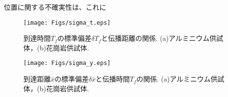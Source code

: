位置に関する不確実性は、これに
\begin{figure}
\begin{center}
	\texttt{[image: Figs/sigma\_t.eps]}
	\caption{到達時間$T_f$の標準偏差$\delta T_f$と伝播距離の関係. (a)アルミニウム供試体，(b)花崗岩供試体.}
	\label{fig:fig13}
\end{center}
\end{figure}
\begin{figure}
\begin{center}
	\texttt{[image: Figs/sigma\_y.eps]}
	\caption{到達距離$\bar{x}$の標準偏差$\delta \bar{x}$と伝播時間$T_f$の関係. (a)アルミニウム供試体，(b)花崗岩供試体.}
	\label{fig:fig14}
\end{center}
\end{figure}
